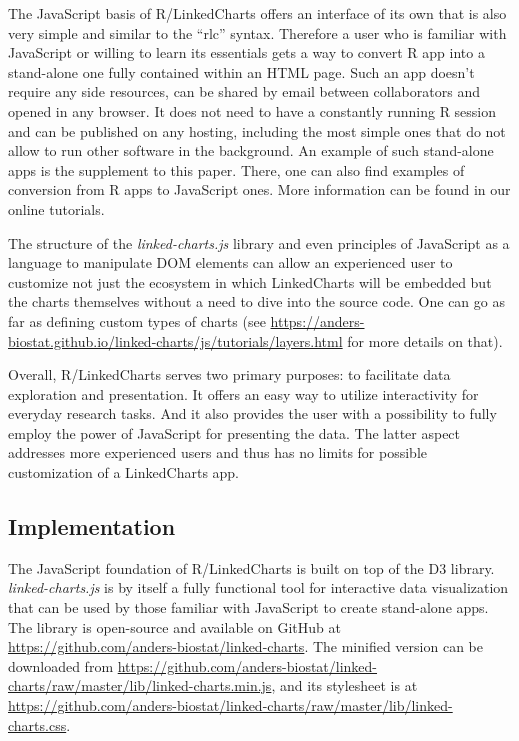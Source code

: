 \documentclass[twocolumn,10pt]{article}
\begin{document}
The JavaScript basis of R/LinkedCharts offers an interface of its own that is also very simple and similar to the ``rlc'' syntax. Therefore a user who is familiar with JavaScript or willing to learn its essentials gets a way to convert R app into a stand-alone one fully contained within an HTML page. Such an app doesn't require any side resources, can be shared by email between collaborators and opened in any browser. It does not need to have a constantly running R session and can be published on any hosting, including the most simple ones that do not allow to run other software in the background. An example of such stand-alone apps is the supplement to this paper. There, one can also find examples of conversion from R apps to JavaScript ones. More information can be found in our online tutorials.

The structure of the \emph{linked-charts.js} library and even principles of JavaScript as a language to manipulate DOM elements can allow an experienced user to customize not just the ecosystem in which LinkedCharts will be embedded but the charts themselves without a need to dive into the source code. One can go as far as defining custom types of charts (see \url{https://anders-biostat.github.io/linked-charts/js/tutorials/layers.html} for more details on that).

Overall, R/LinkedCharts serves two primary purposes: to facilitate data exploration and presentation. It offers an easy way to utilize interactivity for everyday research tasks. And it also provides the user with a possibility to fully employ the power of JavaScript for presenting the data. The latter aspect addresses more experienced users and thus has no limits for possible customization of a LinkedCharts app.


\subsection{Implementation}

The JavaScript foundation of R/LinkedCharts is built on top of the D3 \citep{bostock_2011} library. \emph{linked-charts.js} is by itself a fully functional tool for interactive data visualization that can be used by those familiar with JavaScript to create stand-alone apps. The library is open-source and available on GitHub at \url{https://github.com/anders-biostat/linked-charts}. The minified version can be downloaded from \url{https://github.com/anders-biostat/linked-charts/raw/master/lib/linked-charts.min.js}, and its stylesheet is at \url{https://github.com/anders-biostat/linked-charts/raw/master/lib/linked-charts.css}.
\end{document}
